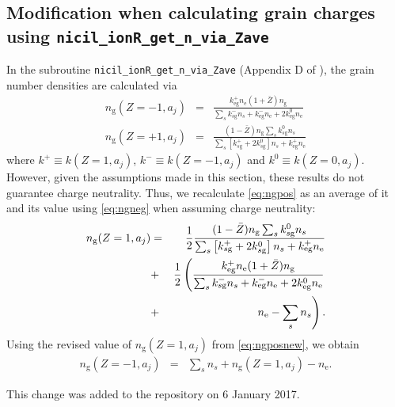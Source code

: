 \documentclass{pasa}%
\begin{document}
\subsection{Modification when calculating grain charges using \texttt{nicil\_ionR\_get\_n\_via\_Zave}}
In the subroutine \texttt{nicil\_ionR\_get\_n\_via\_Zave} (Appendix D of \citealp{Wurster2016}), the grain number densities are calculated via
\begin{eqnarray}
n_\text{g}(Z=-1,a_j) &=& \frac{k_\text{eg}^+n_\text{e}(1+\bar{Z})n_\text{g}}{ \sum_s k_{s\text{g}}^-n_s +  k_\text{eg}^-n_\text{e} + 2k_\text{eg}^0n_\text{e}} \label{eq:ngneg}\\
n_\text{g}(Z=+1,a_j) &=& \frac{(1-\bar{Z})n_\text{g}\sum_s k_{s\text{g}}^0 n_s }{ \sum_s \left[k_{s\text{g}}^+ +2k_{s\text{g}}^0\right]n_s + k_\text{eg}^+ n_\text{e} } \label{eq:ngpos}
\end{eqnarray}
where $k^+\equiv k(Z=1,a_j)$, $k^-\equiv k(Z=-1,a_j)$ and $k^0\equiv k(Z=0,a_j)$.  However, given the assumptions made in this section, these results do not guarantee charge neutrality.  Thus, we recalculate \eqref{eq:ngpos} as an average of it and its value using \eqref{eq:ngneg} when assuming charge neutrality:
\begin{eqnarray}
n_\text{g}(Z=1,a_j) &=&  \frac{1}{2}\frac{(1-\bar{Z})n_\text{g}\sum_s k_{s\text{g}}^0 n_s }{ \sum_s \left[k_{s\text{g}}^+ +2k_{s\text{g}}^0\right]n_s + k_\text{eg}^+ n_\text{e} }  \notag \\
&+& \frac{1}{2}\left(\frac{k_\text{eg}^+n_\text{e}(1+\bar{Z})n_\text{g}}{ \sum_s k_{s\text{g}}^-n_s +  k_\text{eg}^-n_\text{e} + 2k_\text{eg}^0n_\text{e}}\right. \notag \\
&+& \left.n_\text{e} -\sum_s n_s  \right). \label{eq:ngposnew}
\end{eqnarray}
Using the revised value of $n_\text{g}(Z=1,a_j)$ from \eqref{eq:ngposnew}, we obtain
\begin{eqnarray}
n_\text{g}(Z=-1,a_j) &=& \sum_s n_s  + n_\text{g}(Z=1,a_j) - n_\text{e}.
\end{eqnarray}


This change was added to the repository on 6 January 2017.



\end{document}
